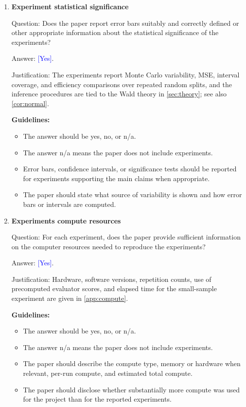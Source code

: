 \documentclass{article}
\theoremstyle{plain}
\theoremstyle{definition}
\newcommand{\1}{\mathbf{1}}
\providecommand{\answerYes}[1][]{\textcolor{blue}{[Yes]#1}}
\begin{document}
\begin{enumerate}[leftmargin=5mm]
\item \textbf{Experiment statistical significance}

Question: Does the paper report error bars suitably and correctly defined or
other appropriate information about the statistical significance of the
experiments?

Answer: \answerYes{}.

Justification: The experiments report Monte Carlo variability, MSE, interval
coverage, and efficiency comparisons over repeated random splits, and the
inference procedures are tied to the Wald theory in \cref{sec:theory}; see also
\cref{cor:normal}.

\textbf{Guidelines:}
\begin{itemize}[leftmargin=5mm, noitemsep]
\item The answer should be yes, no, or n/a.
\item The answer n/a means the paper does not include experiments.
\item Error bars, confidence intervals, or significance tests should be
reported for experiments supporting the main claims when appropriate.
\item The paper should state what source of variability is shown and how error
bars or intervals are computed.
\end{itemize}

\item \textbf{Experiments compute resources}

Question: For each experiment, does the paper provide sufficient information on
the computer resources needed to reproduce the experiments?

Answer: \answerYes{}.

Justification: Hardware, software versions, repetition counts, use of
precomputed evaluator scores, and elapsed time for the small-sample experiment
are given in \cref{app:compute}.

\textbf{Guidelines:}
\begin{itemize}[leftmargin=5mm, noitemsep]
\item The answer should be yes, no, or n/a.
\item The answer n/a means the paper does not include experiments.
\item The paper should describe the compute type, memory or hardware when
relevant, per-run compute, and estimated total compute.
\item The paper should disclose whether substantially more compute was used for
the project than for the reported experiments.
\end{itemize}


\end{enumerate}
\end{document}
